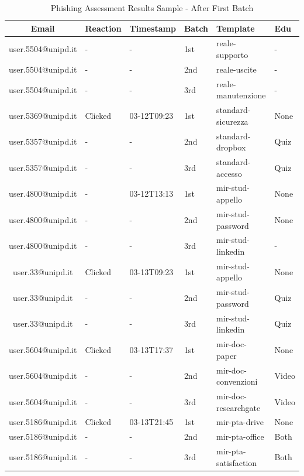 \documentclass[a4paper]{article}
\begin{document}
\begingroup
\renewcommand{\arraystretch}{1.25}
\begin{table}[ht]
\begin{center}
    \begin{tabular}{ | c | l | l | l | l | l | }
    \hline
    \textbf{Email} & \textbf{Reaction} & \textbf{Timestamp} & \textbf{Batch} & \textbf{Template} & \textbf{Edu} \\
    \hline
    user.5504@unipd.it & - & - & 1st & reale-supporto & - \\
    \hline
    user.5504@unipd.it & - & - & 2nd & reale-uscite & - \\
    \hline
    user.5504@unipd.it & - & - & 3rd & reale-manutenzione & - \\
    \hline
    user.5369@unipd.it & Clicked & 03-12T09:23 & 1st & standard-sicurezza & None \\
    \hline
    user.5357@unipd.it & - & - & 2nd & standard-dropbox & Quiz \\
    \hline
    user.5357@unipd.it & - & - & 3rd & standard-accesso & Quiz \\
    \hline
    user.4800@unipd.it & - & 03-12T13:13 & 1st & mir-stud-appello & None \\
    \hline
    user.4800@unipd.it & - & - & 2nd & mir-stud-password & None \\
    \hline
    user.4800@unipd.it & - & - & 3rd & mir-stud-linkedin & - \\
    \hline
    user.33@unipd.it & Clicked & 03-13T09:23 & 1st & mir-stud-appello & None \\
    \hline
    user.33@unipd.it & - & - & 2nd & mir-stud-password & Quiz \\
    \hline
    user.33@unipd.it & - & - & 3rd & mir-stud-linkedin & Quiz \\
    \hline
    user.5604@unipd.it & Clicked & 03-13T17:37 & 1st & mir-doc-paper & None \\
    \hline
    user.5604@unipd.it & - & - & 2nd & mir-doc-convenzioni & Video \\
    \hline
    user.5604@unipd.it & - & - & 3rd & mir-doc-researchgate & Video \\
    \hline
    user.5186@unipd.it & Clicked & 03-13T21:45 & 1st & mir-pta-drive & None \\
    \hline
    user.5186@unipd.it & - & - & 2nd & mir-pta-office & Both \\
    \hline
    user.5186@unipd.it & - & - & 3rd & mir-pta-satisfaction & Both \\
    \hline
    \end{tabular}
\end{center}
\caption{Phishing Assessment Results Sample - After First Batch}
\label{t-res-sample}
\end{table}
\end{document}
